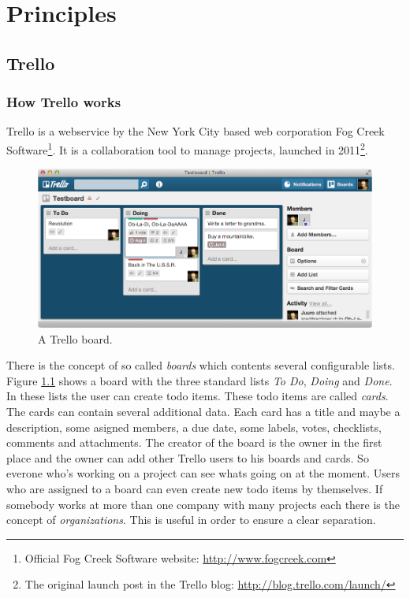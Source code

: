 
\chapter{Principles}
  \label{Principles}

\section{Trello}

\subsection{How Trello works}
Trello is a webservice by the New York City based web corporation Fog Creek Software\footnote{Official Fog Creek Software website: \url{http://www.fogcreek.com}}. It is a collaboration tool to manage projects, launched in 2011\footnote{The original launch post in the Trello blog: \url{http://blog.trello.com/launch/}}. 

\begin{figure}[htb]
\centering
\includegraphics[width=\textwidth]{figures/trello}
\caption{A Trello board.}
\label{fig:trello}
\end{figure}

There is the concept of so called \emph{boards} which contents several configurable lists. Figure \ref{fig:trello} shows a board with the three standard lists \emph{To Do}, \emph{Doing} and \emph{Done}. In these lists the user can create todo items. These todo items are called \emph{cards}. The cards can contain several additional data. Each card has a title and maybe a description, some asigned members, a due date, some labels, votes, checklists, comments and attachments. The creator of the board is the owner in the first place and the owner can add other Trello users to his boards and cards. So everone who's working on a project can see whats going on at the moment. Users who are assigned to a board can even create new todo items by themselves. If somebody works at more than one company with many projects each there is the concept of \emph{organizations}. This is useful in order to ensure a clear separation.

